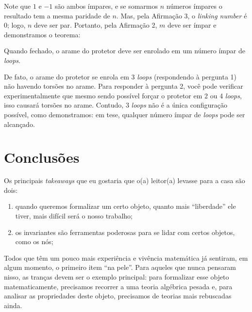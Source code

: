 	\par\vspace{0.3cm} Note que $1$ e $-1$ são ambos ímpares, e se somarmos $n$ números ímpares o resultado 
	tem a mesma paridade de $n$. Mas, pela Afirmação 3, o \textit{linking number} é $0$; logo, $n$ deve ser par.
	Portanto, pela Afirmação 2, $m$ deve ser ímpar e demonstramos o teorema:
	\begin{theorem}
	\label{teorema protetor de para-brisa}
		Quando fechado, o arame do protetor deve ser enrolado em um número ímpar de \textit{loops}.
	\end{theorem}  
	De fato, o arame do protetor se enrola em 3 \textit{loops} (respondendo à pergunta 1) 
	não havendo torsões no arame. Para responder à pergunta 2, você pode verificar experimentalmente que 
	mesmo sendo possível forçar o protetor em 2 ou 4 \textit{loops}, isso causará torsões no arame. Contudo, 
	$3$ \textit{loops} não é a única configuração possível, como demonstramos: em tese, qualquer número 
	ímpar de \textit{loops} pode ser alcançado.
\section{Conclusões}
    Os principais {\it takeaways} que eu gostaria que o(a) leitor(a) levasse para a casa são dois:
    \begin{enumerate}
        \item quando queremos formalizar um certo objeto, quanto mais ``liberdade'' ele tiver, mais difícil
        será o nosso trabalho;
        \item os invariantes são ferramentas poderosas para se lidar com certos objetos, como os nós;
    \end{enumerate}
    \par\vspace{0.3cm} Todos que têm um pouco mais experiência e vivência matemática já sentiram, 
    em algum momento, o primeiro item ``na pele''. Para aqueles que nunca pensaram nisso, as tranças 
    devem ser o exemplo principal:
    para formalizar esse objeto matematicamente, precisamos recorrer a uma teoria algébrica pesada e, 
    para analisar as propriedades deste objeto, precisamos de teorias mais rebuscadas ainda.
    
